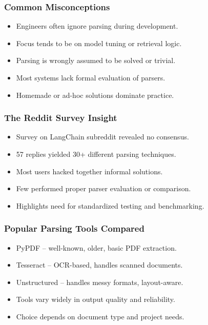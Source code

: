 \begin{frame}[fragile]\frametitle{Common Misconceptions}
  \begin{itemize}
    \item Engineers often ignore parsing during development.
    \item Focus tends to be on model tuning or retrieval logic.
    \item Parsing is wrongly assumed to be solved or trivial.
    \item Most systems lack formal evaluation of parsers.
    \item Homemade or ad-hoc solutions dominate practice.
  \end{itemize}
\end{frame}

\begin{frame}[fragile]\frametitle{The Reddit Survey Insight}
  \begin{itemize}
    \item Survey on LangChain subreddit revealed no consensus.
    \item 57 replies yielded 30+ different parsing techniques.
    \item Most users hacked together informal solutions.
    \item Few performed proper parser evaluation or comparison.
    \item Highlights need for standardized testing and benchmarking.
  \end{itemize}
\end{frame}

\begin{frame}[fragile]\frametitle{Popular Parsing Tools Compared}
  \begin{itemize}
    \item PyPDF – well-known, older, basic PDF extraction.
    \item Tesseract – OCR-based, handles scanned documents.
    \item Unstructured – handles messy formats, layout-aware.
    \item Tools vary widely in output quality and reliability.
    \item Choice depends on document type and project needs.
  \end{itemize}
\end{frame}

